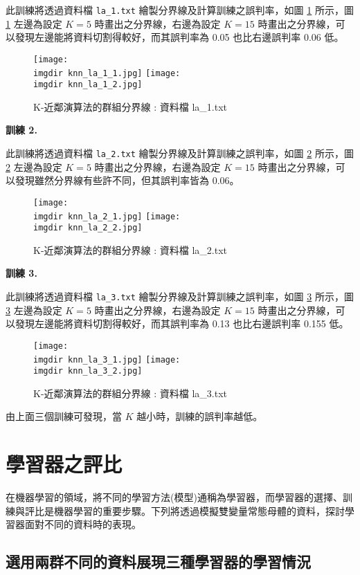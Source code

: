 此訓練將透過資料檔 \verb|la_1.txt| 繪製分界線及計算訓練之誤判率，如圖 \ref{fig:knn_la_1} 所示，圖 \ref{fig:knn_la_1} 左邊為設定 $K = 5$ 時畫出之分界線，右邊為設定 $K = 15$ 時畫出之分界線，可以發現左邊能將資料切割得較好，而其誤判率為 0.05 也比右邊誤判率 0.06 低。

\begin{figure}[H]
\centering
\texttt{[image: \\imgdir knn\_la\_1\_1.jpg]}
\texttt{[image: \\imgdir knn\_la\_1\_2.jpg]}
\caption{K-近鄰演算法的群組分界線 : 資料檔 la\_1.txt} 
\label{fig:knn_la_1}
\end{figure}

\textbf{\large 訓練 2.}

此訓練將透過資料檔 \verb|la_2.txt| 繪製分界線及計算訓練之誤判率，如圖 \ref{fig:knn_la_2} 所示，圖 \ref{fig:knn_la_2} 左邊為設定 $K = 5$ 時畫出之分界線，右邊為設定 $K = 15$ 時畫出之分界線，可以發現雖然分界線有些許不同，但其誤判率皆為 0.06。

\begin{figure}[H]
\centering
\texttt{[image: \\imgdir knn\_la\_2\_1.jpg]}
\texttt{[image: \\imgdir knn\_la\_2\_2.jpg]}
\caption{K-近鄰演算法的群組分界線 : 資料檔 la\_2.txt} 
\label{fig:knn_la_2}
\end{figure}

\textbf{\large 訓練 3.}

此訓練將透過資料檔 \verb|la_3.txt| 繪製分界線及計算訓練之誤判率，如圖 \ref{fig:knn_la_3} 所示，圖 \ref{fig:knn_la_3} 左邊為設定 $K = 5$ 時畫出之分界線，右邊為設定 $K = 15$ 時畫出之分界線，可以發現左邊能將資料切割得較好，而其誤判率為 0.13 也比右邊誤判率 0.155 低。

\begin{figure}[H]
\centering
\texttt{[image: \\imgdir knn\_la\_3\_1.jpg]}
\texttt{[image: \\imgdir knn\_la\_3\_2.jpg]}
\caption{K-近鄰演算法的群組分界線 : 資料檔 la\_3.txt} 
\label{fig:knn_la_3}
\end{figure}

由上面三個訓練可發現，當 $K$ 越小時，訓練的誤判率越低。
\section{學習器之評比}
在機器學習的領域，將不同的學習方法(模型)通稱為學習器，而學習器的選擇、訓練與評比是機器學習的重要步驟。下列將透過模擬雙變量常態母體的資料，探討學習器面對不同的資料時的表現。
\subsection{選用兩群不同的資料展現三種學習器的學習情況}

